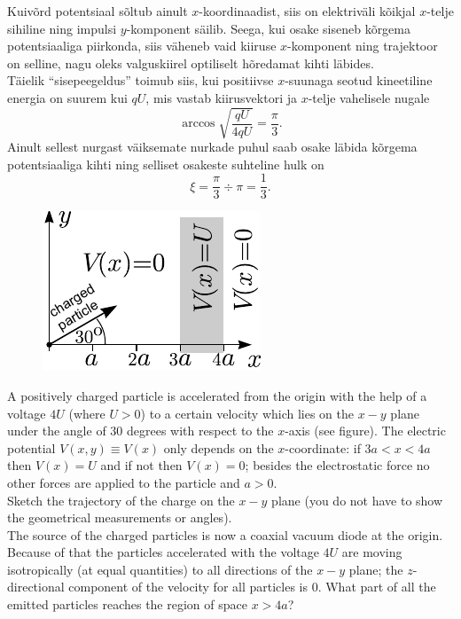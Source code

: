 \solu
\osa Kuivõrd potentsiaal sõltub ainult $x$-koordinaadist, siis on elektriväli kõikjal $x$-telje sihiline ning
impulsi $y$-komponent säilib. Seega, kui osake siseneb kõrgema potentsiaaliga piirkonda, siis 
väheneb vaid kiiruse $x$-komponent ning
trajektoor on selline, nagu oleks valguskiirel optiliselt hõredamat kihti läbides.\\
\osa Täielik \enquote{sisepeegeldus} toimub siis, kui positiivse $x$-suunaga 
seotud kineetiline energia on suurem kui $qU$, mis vastab kiirusvektori 
ja $x$-telje vahelisele nugale
\[
\arccos \sqrt{\frac {qU}{4qU}}=\frac \pi 3.
\]
Ainult sellest nurgast väiksemate nurkade puhul saab osake läbida kõrgema 
potentsiaaliga kihti ning selliset osakeste suhteline hulk on
\[
\xi = \frac \pi 3 \div \pi = \frac 13.
\]

\begin{figure}%
\vspace{-10pt}
\includegraphics[width=\linewidth]{2012-v3g-09-laeng_ing}%
\end{figure}
A positively charged particle is accelerated from the origin with the help of a voltage $4U$ (where $U>0$) to a certain velocity which lies on the $x-y$ plane under the angle of $30$ degrees with respect to the $x$-axis (see figure). The electric potential $V(x,y)\equiv V(x)$ only depends on the $x$-coordinate: if $3a<x<4a$ then $V(x)=U$ and if not then $V(x)=0$; besides the electrostatic force no other forces are applied to the particle and $a>0$.\\
\osa Sketch the trajectory of the charge on the $x-y$ plane (you do not have to show the geometrical measurements or angles).\\
\osa The source of the charged particles is now a coaxial vacuum diode at the origin. Because of that the particles accelerated with the voltage $4U$ are moving isotropically (at equal quantities) to all directions of the $x-y$ plane; the $z$-directional component of the velocity for all particles is 0. What part of all the emitted particles reaches the region of space $x>4a$?

